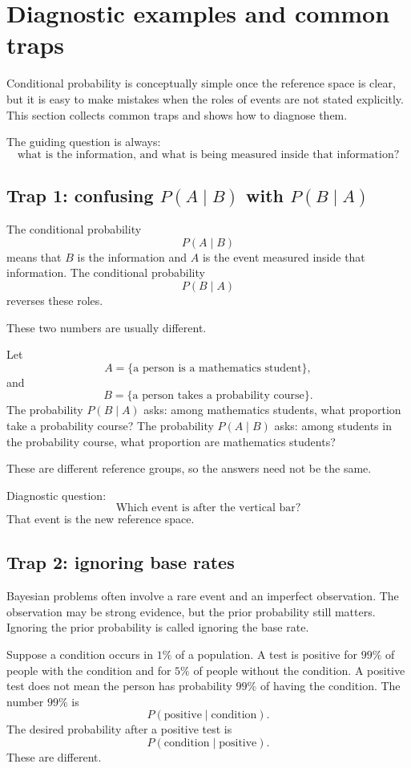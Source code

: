 \section{Diagnostic examples and common traps}

Conditional probability is conceptually simple once the reference space is clear,
but it is easy to make mistakes when the roles of events are not stated
explicitly. This section collects common traps and shows how to diagnose them.

The guiding question is always:
\[
\text{what is the information, and what is being measured inside that information?}
\]

\subsection*{Trap 1: confusing \(P(A\mid B)\) with \(P(B\mid A)\)}

The conditional probability
\[
P(A\mid B)
\]
means that \(B\) is the information and \(A\) is the event measured inside that
information. The conditional probability
\[
P(B\mid A)
\]
reverses these roles.

These two numbers are usually different.

\begin{examplebox}
Let
\[
A=\{\text{a person is a mathematics student}\},
\]
and
\[
B=\{\text{a person takes a probability course}\}.
\]
The probability \(P(B\mid A)\) asks: among mathematics students, what proportion
take a probability course? The probability \(P(A\mid B)\) asks: among students in
the probability course, what proportion are mathematics students?

These are different reference groups, so the answers need not be the same.
\end{examplebox}

Diagnostic question:
\[
\text{Which event is after the vertical bar?}
\]
That event is the new reference space.

\subsection*{Trap 2: ignoring base rates}

Bayesian problems often involve a rare event and an imperfect observation. The
observation may be strong evidence, but the prior probability still matters.
Ignoring the prior probability is called ignoring the base rate.

Suppose a condition occurs in \(1\%\) of a population. A test is positive for
\(99\%\) of people with the condition and for \(5\%\) of people without the
condition. A positive test does not mean the person has probability \(99\%\) of
having the condition. The number \(99\%\) is
\[
P(\text{positive}\mid\text{condition}).
\]
The desired probability after a positive test is
\[
P(\text{condition}\mid\text{positive}).
\]
These are different.

